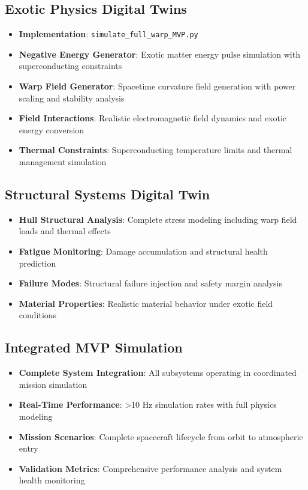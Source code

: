 \documentclass[11pt]{article}
\begin{document}
\subsection{Exotic Physics Digital Twins}
\begin{itemize}
\item \textbf{Implementation}: \texttt{simulate\_full\_warp\_MVP.py}
\item \textbf{Negative Energy Generator}: Exotic matter energy pulse simulation with superconducting constraints
\item \textbf{Warp Field Generator}: Spacetime curvature field generation with power scaling and stability analysis
\item \textbf{Field Interactions}: Realistic electromagnetic field dynamics and exotic energy conversion
\item \textbf{Thermal Constraints}: Superconducting temperature limits and thermal management simulation
\end{itemize}

\subsection{Structural Systems Digital Twin}
\begin{itemize}
\item \textbf{Hull Structural Analysis}: Complete stress modeling including warp field loads and thermal effects
\item \textbf{Fatigue Monitoring}: Damage accumulation and structural health prediction
\item \textbf{Failure Modes}: Structural failure injection and safety margin analysis
\item \textbf{Material Properties}: Realistic material behavior under exotic field conditions
\end{itemize}

\subsection{Integrated MVP Simulation}
\begin{itemize}
\item \textbf{Complete System Integration}: All subsystems operating in coordinated mission simulation
\item \textbf{Real-Time Performance}: >10 Hz simulation rates with full physics modeling
\item \textbf{Mission Scenarios}: Complete spacecraft lifecycle from orbit to atmospheric entry
\item \textbf{Validation Metrics}: Comprehensive performance analysis and system health monitoring
\end{itemize}
\end{document}
